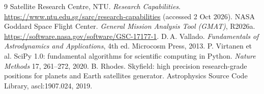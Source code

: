 \documentclass[11pt]{article}
\begin{document}
\vspace{-0.6em}
{\footnotesize\raggedright
\begin{thebibliography}{9}\setlength{\itemsep}{0pt}\setlength{\parskip}{0pt}
 Satellite Research Centre, NTU. \emph{Research Capabilities}. \url{https://www.ntu.edu.sg/sarc/research-capabilities} (accessed 2 Oct 2026).
 NASA Goddard Space Flight Center. \emph{General Mission Analysis Tool (GMAT)}, R2026a. \url{https://software.nasa.gov/software/GSC-17177-1}.
 D.\,A. Vallado. \emph{Fundamentals of Astrodynamics and Applications}, 4th ed. Microcosm Press, 2013.
 P. Virtanen et al. SciPy 1.0: fundamental algorithms for scientific computing in Python. \emph{Nature Methods} 17, 261--272, 2020.
 B. Rhodes. Skyfield: high precision research-grade positions for planets and Earth satellites generator. Astrophysics Source Code Library, ascl:1907.024, 2019.
\end{thebibliography}
}
\end{document}
